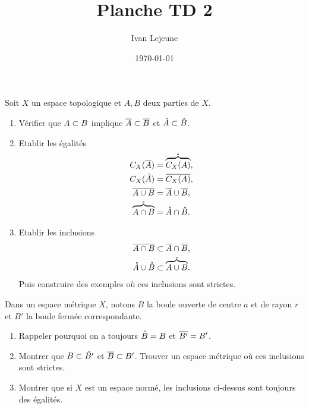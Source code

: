 \documentclass[french,a4paper,10pt]{article}
\title{\color{astral} \sffamily \bfseries Planche TD 2}
\author{Ivan Lejeune}
\date{\today}
\begin{document}
	
	\maketitle



    \begin{td-exo}[2]
        Soit $X$ un espace topologique et $A,B$ deux parties de $X$.
        \begin{enumerate}
            \item Vérifier que $A\subset B$ implique $\overline{A}\subset\overline{B}$ et $\mathring{A}\subset \mathring{B}$.

            \item Etablir les égalités
                \[\begin{gathered}
                    C_X(\overline{A})=\mathring{\overbrace{C_X(A)}},\\
                    C_X(\mathring{A})=\overline{C_X(A)},\\
                    \overline{A\cup B}=\overline{A}\cup\overline{B},\\
                    \mathring{\overbrace{A\cap B}}=\mathring{A}\cap\mathring{B}.
                \end{gathered}\]

            \item Etablir les inclusions
                \[\begin{gathered}
                    \overline{A\cap B}\subset\overline{A}\cap \overline{B},\\
                    \mathring{A}\cup \mathring{B}\subset\mathring{\overbrace{A\cup B}}.
                \end{gathered}\]
                Puis construire des exemples où ces inclusions sont strictes.

        \end{enumerate}
    \end{td-exo}

    \begin{td-exo}[3]
        Dans un espace métrique $X$, notons $B$ la boule ouverte de centre $a$ et de rayon $r$
        et $B'$ la boule fermée correspondante.

        \begin{enumerate}
            \item Rappeler pourquoi on a toujours $\mathring{B}=B$ et $\overline{B'}=B'$.

            \item Montrer que $B\subset \mathring{B'}$ et $\overline{B}\subset B'$. Trouver
            un espace métrique où ces inclusions sont strictes.

            \item Montrer que si $X$ est un espace normé, les inclusions ci-dessus
            sont toujours des égalités.

        \end{enumerate}


    \end{td-exo}
\end{document}
